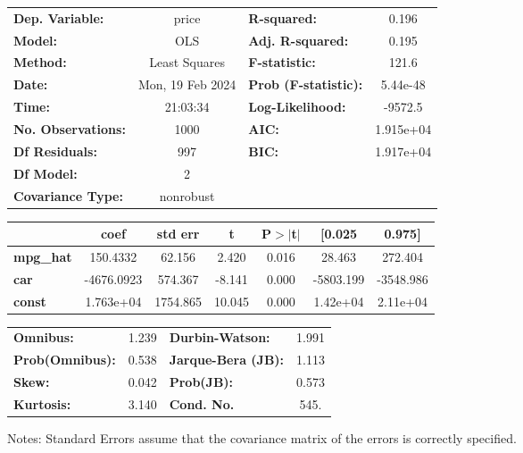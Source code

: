\begin{center}
\begin{tabular}{lclc}
\toprule
\textbf{Dep. Variable:}    &      price       & \textbf{  R-squared:         } &     0.196   \\
\textbf{Model:}            &       OLS        & \textbf{  Adj. R-squared:    } &     0.195   \\
\textbf{Method:}           &  Least Squares   & \textbf{  F-statistic:       } &     121.6   \\
\textbf{Date:}             & Mon, 19 Feb 2024 & \textbf{  Prob (F-statistic):} &  5.44e-48   \\
\textbf{Time:}             &     21:03:34     & \textbf{  Log-Likelihood:    } &   -9572.5   \\
\textbf{No. Observations:} &        1000      & \textbf{  AIC:               } & 1.915e+04   \\
\textbf{Df Residuals:}     &         997      & \textbf{  BIC:               } & 1.917e+04   \\
\textbf{Df Model:}         &           2      & \textbf{                     } &             \\
\textbf{Covariance Type:}  &    nonrobust     & \textbf{                     } &             \\
\bottomrule
\end{tabular}
\begin{tabular}{lcccccc}
                  & \textbf{coef} & \textbf{std err} & \textbf{t} & \textbf{P$> |$t$|$} & \textbf{[0.025} & \textbf{0.975]}  \\
\midrule
\textbf{mpg\_hat} &     150.4332  &       62.156     &     2.420  &         0.016        &       28.463    &      272.404     \\
\textbf{car}      &   -4676.0923  &      574.367     &    -8.141  &         0.000        &    -5803.199    &    -3548.986     \\
\textbf{const}    &    1.763e+04  &     1754.865     &    10.045  &         0.000        &     1.42e+04    &     2.11e+04     \\
\bottomrule
\end{tabular}
\begin{tabular}{lclc}
\textbf{Omnibus:}       &  1.239 & \textbf{  Durbin-Watson:     } &    1.991  \\
\textbf{Prob(Omnibus):} &  0.538 & \textbf{  Jarque-Bera (JB):  } &    1.113  \\
\textbf{Skew:}          &  0.042 & \textbf{  Prob(JB):          } &    0.573  \\
\textbf{Kurtosis:}      &  3.140 & \textbf{  Cond. No.          } &     545.  \\
\bottomrule
\end{tabular}
\end{center}

Notes: \newline
 [1] Standard Errors assume that the covariance matrix of the errors is correctly specified.